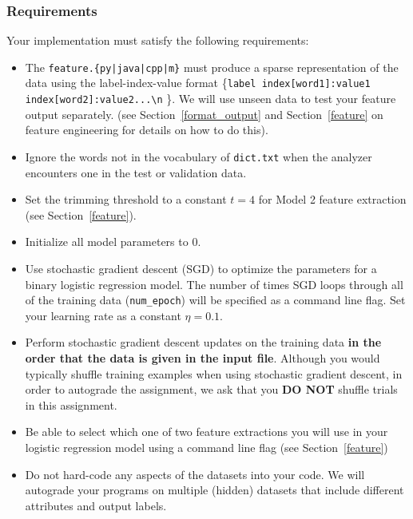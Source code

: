 \documentclass[11pt]{article}
\numberwithin{equation}{section} %
\numberwithin{figure}{section} %
\numberwithin{table}{section} %
\begin{document}
\subsubsection{Requirements}
Your implementation must satisfy the following requirements:
\begin{itemize}
    \item The \texttt{feature.\{py|java|cpp|m\}} must produce a sparse representation of the data using the label-index-value format \{\lstinline{label index[word1]:value1  index[word2]:value2...\n} \}. We will use unseen data to test your feature output separately. (see Section~\ref{format_output} and Section~\ref{feature} on feature engineering for details on how to do this). 
    \item Ignore the words not in the vocabulary of \lstinline{dict.txt} when the analyzer encounters one in the test or validation data.
    \item Set the trimming threshold to a constant $t=4$ for Model 2 feature extraction (see Section~\ref{feature}). 
    \item Initialize all model parameters to $0$.
    \item Use stochastic gradient descent (SGD) to optimize the parameters for a binary logistic regression model. The number of times SGD loops through all of the training data (\texttt{num\_epoch}) will be specified as a command line flag. Set your learning rate as a constant  $\eta = 0.1$.
    \item Perform stochastic gradient descent updates on the training data \textbf{in the order that the data is given in the input file}. Although you would typically shuffle training examples when using stochastic gradient descent, in order to autograde the assignment, we ask that you {\bf DO NOT} shuffle trials in this assignment.
    \item Be able to select which one of two feature extractions you will use in your logistic regression model using a command line flag (see Section~\ref{feature})
    \item Do not hard-code any aspects of the datasets into your code. We will autograde your programs on multiple (hidden) datasets that include different attributes and output labels.
\end{itemize}
\end{document}
